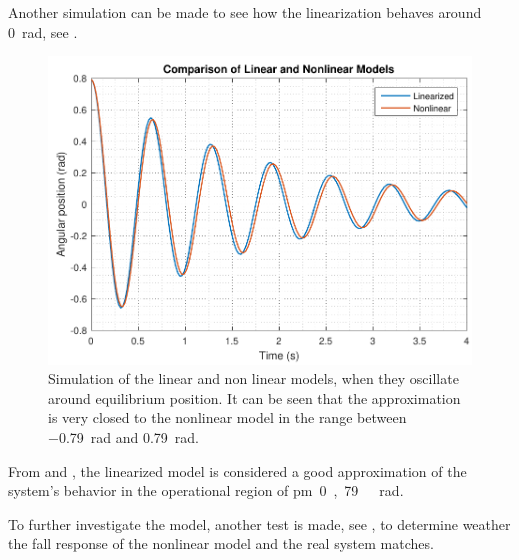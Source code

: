 Another simulation can be made to see how the linearization behaves around \SI{0}{rad}, see .

\begin{figure}[H] 
	\centering 
	\includegraphics[scale=0.6]{figures/LinearizedVSNonlinear_0}
	\caption{Simulation of the linear and non linear models, when they oscillate around equilibrium position. It can be seen that the approximation is very closed to the nonlinear model in the range between \SI{-0,79}{rad} and \SI{0,79}{rad}.}
	\label{LinearizedVSNonlinear_0}
\end{figure}

From  and , the linearized model is considered a good approximation of the system's behavior in the operational region of \si{\pm 0,79\ rad}.

To further investigate the model, another test is made, see , to determine weather the fall response of the nonlinear model and the real system matches.

